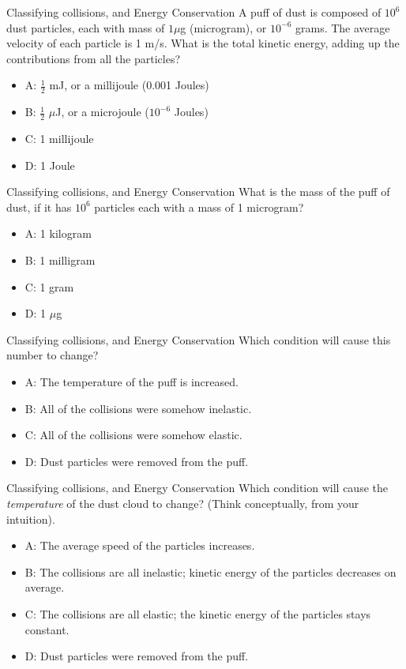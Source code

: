 \documentclass{beamer}
\begin{document}
\begin{frame}{Classifying collisions, and Energy Conservation}
A puff of dust is composed of $10^6$ dust particles, each with mass of $1 \mu$g (microgram), or $10^{-6}$ grams.  The average velocity of each particle is 1 m/s.  What is the total kinetic energy, adding up the contributions from all the particles?
\begin{itemize}
\item A: $\frac{1}{2}$ mJ, or a millijoule (0.001 Joules)
\item B: $\frac{1}{2}$ $\mu$J, or a microjoule ($10^{-6}$ Joules)
\item C: 1 millijoule
\item D: 1 Joule
\end{itemize}
\end{frame}

\begin{frame}{Classifying collisions, and Energy Conservation}
What is the mass of the puff of dust, if it has $10^6$ particles each with a mass of 1 microgram?  
\begin{itemize}
\item A: 1 kilogram
\item B: 1 milligram
\item C: 1 gram
\item D: 1 $\mu$g
\end{itemize}
\end{frame}

\begin{frame}{Classifying collisions, and Energy Conservation}
Which condition will cause this number to change?
\begin{itemize}
\item A: The temperature of the puff is increased.
\item B: All of the collisions were somehow inelastic.
\item C: All of the collisions were somehow elastic.
\item D: Dust particles were removed from the puff.
\end{itemize}
\end{frame}

\begin{frame}{Classifying collisions, and Energy Conservation}
Which condition will cause the \textit{temperature} of the dust cloud to change?  (Think conceptually, from your intuition).
\begin{itemize}
\item A: The average speed of the particles increases.
\item B: The collisions are all inelastic; kinetic energy of the particles decreases on average.
\item C: The collisions are all elastic; the kinetic energy of the particles stays constant.
\item D: Dust particles were removed from the puff.
\end{itemize}
\end{frame}
\end{document}
